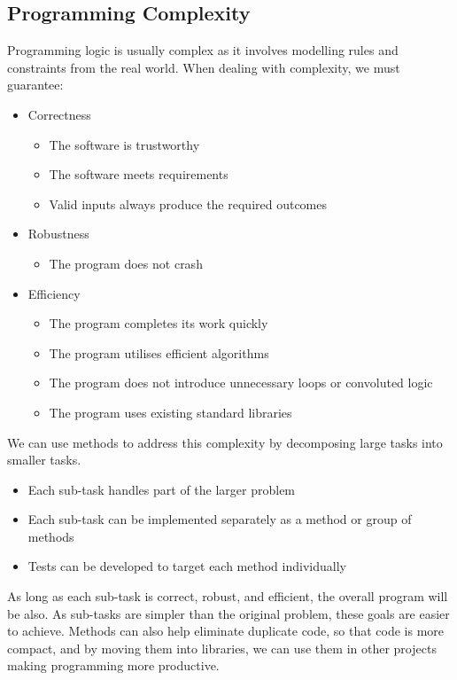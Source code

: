 \documentclass{article}
\begin{document}
\subsection{Programming Complexity}
Programming logic is usually complex as it involves modelling rules and
constraints from the real world. When dealing with complexity, we must
guarantee:
\begin{itemize}
    \item Correctness
          \begin{itemize}
              \item The software is trustworthy
              \item The software meets requirements
              \item Valid inputs always produce the required outcomes
          \end{itemize}
    \item Robustness
          \begin{itemize}
              \item The program does not crash
          \end{itemize}
    \item Efficiency
          \begin{itemize}
              \item The program completes its work quickly
              \item The program utilises efficient algorithms
              \item The program does not introduce unnecessary loops or
                    convoluted logic
              \item The program uses existing standard libraries
          \end{itemize}
\end{itemize}
We can use methods to address this complexity by decomposing large tasks into smaller tasks.
\begin{itemize}
    \item Each sub-task handles part of the larger problem
    \item Each sub-task can be implemented separately as a method or
          group of methods
    \item Tests can be developed to target each method individually
\end{itemize}
As long as each sub-task is correct, robust, and efficient, the overall program will be also.
As sub-tasks are simpler than the original problem, these goals are easier to achieve.
Methods can also help eliminate duplicate code, so that code is more compact, and by
moving them into libraries, we can use them in other projects making programming
more productive.
\end{document}
